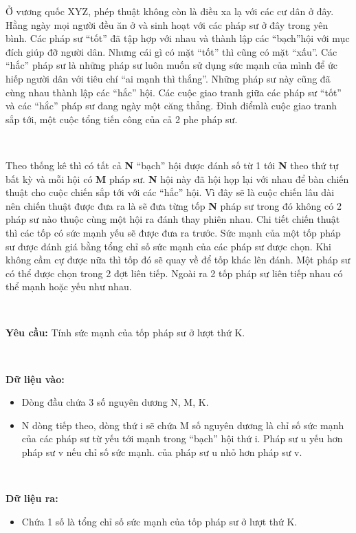 

Ở vương quốc XYZ, phép thuật không còn là điều xa lạ với các cư dân ở đây. Hằng ngày mọi người đều ăn ở và sinh hoạt với các pháp sư ở đây trong yên bình. Các pháp sư “tốt” đã tập hợp với nhau và thành lập các “bạch”hội với mục đích giúp đỡ người dân. Nhưng cái gì có mặt “tốt” thì cũng có mặt “xấu”. Các “hắc” pháp sư là những pháp sư luôn muốn sử dụng sức mạnh của mình để ức hiếp người dân với tiêu chí “ai mạnh thì thắng”. Những pháp sư này cũng đã cùng nhau thành lập các “hắc” hội. Các cuộc giao tranh giữa các pháp sư “tốt” và các “hắc” pháp sư đang ngày một căng thẳng. Đỉnh điểmlà cuộc giao tranh sắp tới, một cuộc tổng tiến công của cả 2 phe pháp sư.

 

Theo thống kê thì có tất cả \textbf{ N } “bạch” hội được đánh số từ 1 tới \textbf{ N } theo thứ tự bất kỳ và mỗi hội có \textbf{ M } pháp sư. \textbf{ N } hội này đã hội họp lại với nhau để bàn chiến thuật cho cuộc chiến sắp tới với các “hắc” hội. Vì đây sẽ là cuộc chiến lâu dài nên chiến thuật được đưa ra là sẽ đưa từng tốp \textbf{ N } pháp sư trong đó không có 2 pháp sư nào thuộc cùng một hội ra đánh thay phiên nhau. Chi tiết chiến thuật thì các tốp có sức mạnh yếu sẽ được đưa ra trước. Sức mạnh của một tốp pháp sư được đánh giá bằng tổng chỉ số sức mạnh của các pháp sư được chọn. Khi không cầm cự được nữa thì tốp đó sẽ quay về để tốp khác lên đánh. Một pháp sư có thể được chọn trong 2 đợt liên tiếp. Ngoài ra 2 tốp pháp sư liên tiếp nhau có thể mạnh hoặc yếu như nhau.

 

\textbf{Yêu cầu: } Tính sức mạnh của tốp pháp sư ở lượt thứ K.

 

\textbf{Dữ liệu vào: }
\begin{itemize}
	\item 

Dòng đầu chứa 3 số nguyên dương N, M, K.
	\item 

N dòng tiếp theo, dòng thứ i sẽ chứa M số nguyên dương là chỉ số sức mạnh của các pháp sư từ yếu tới mạnh trong “bạch” hội thứ i. Pháp sư u yếu hơn pháp sư v nếu chỉ số sức mạnh. của pháp sư u nhỏ hơn pháp sư v.
\end{itemize}

 

\textbf{Dữ liệu ra: }
\begin{itemize}
	\item 

Chứa 1 số là tổng chỉ số sức mạnh của tốp pháp sư ở lượt thứ K.
\end{itemize}

